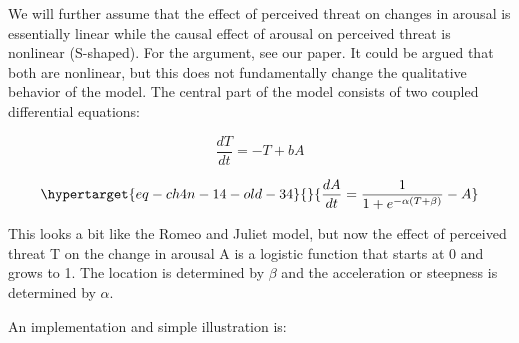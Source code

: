 \documentclass[
  a4paper,
  DIV=11,
  numbers=noendperiod,
  oneside]{scrreprt}
\begin{document}
We will further assume that the effect of perceived threat on changes in
arousal is essentially linear while the causal effect of arousal on
perceived threat is nonlinear (S-shaped). For the argument, see our
paper. It could be argued that both are nonlinear, but this does not
fundamentally change the qualitative behavior of the model. The central
part of the model consists of two coupled differential equations:

\[\frac{dT}{dt} = - T + bA\]

\begin{equation}\protect\hypertarget{eq-ch4n-14-old-34}{}{
\frac{dA}{dt} = \frac{1}{1 + e^{- \alpha(T + \beta)}} - A
}\label{eq-ch4n-14-old-34}\end{equation}

This looks a bit like the Romeo and Juliet model, but now the effect of
perceived threat T on the change in arousal A is a logistic function
that starts at 0 and grows to 1. The location is determined by \(\beta\)
and the acceleration or steepness is determined by \(\alpha\).

An implementation and simple illustration is:
\end{document}
